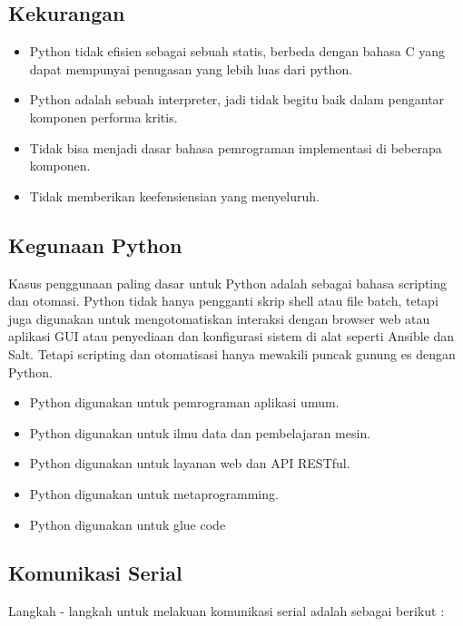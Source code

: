 	\subsection{Kekurangan}
		\begin{itemize}
			\item Python tidak efisien sebagai sebuah statis, berbeda dengan bahasa C yang dapat mempunyai penugasan yang lebih luas dari python.
			\item Python adalah sebuah interpreter, jadi tidak begitu baik dalam pengantar komponen performa kritis.
			\item Tidak bisa menjadi dasar bahasa pemrograman implementasi di beberapa komponen.
			\item Tidak memberikan keefensiensian yang menyeluruh.
		\end{itemize}
	
	\subsection{Kegunaan Python}		
	Kasus penggunaan paling dasar untuk Python adalah sebagai bahasa scripting dan otomasi. Python tidak hanya pengganti skrip shell atau file batch, 
	tetapi juga digunakan untuk mengotomatiskan interaksi dengan browser web atau aplikasi GUI atau penyediaan dan konfigurasi sistem di alat seperti 
	Ansible dan Salt. Tetapi scripting dan otomatisasi hanya mewakili puncak gunung es dengan Python.
		\begin{itemize}
			\item Python digunakan untuk pemrograman aplikasi umum.
			\item Python digunakan untuk ilmu data dan pembelajaran mesin.
			\item Python digunakan untuk layanan web dan API RESTful.
			\item Python digunakan untuk metaprogramming.
			\item Python digunakan untuk glue code
		\end{itemize}
	
	\subsection{Komunikasi Serial}
		Langkah - langkah untuk melakuan komunikasi serial adalah sebagai berikut :
		
